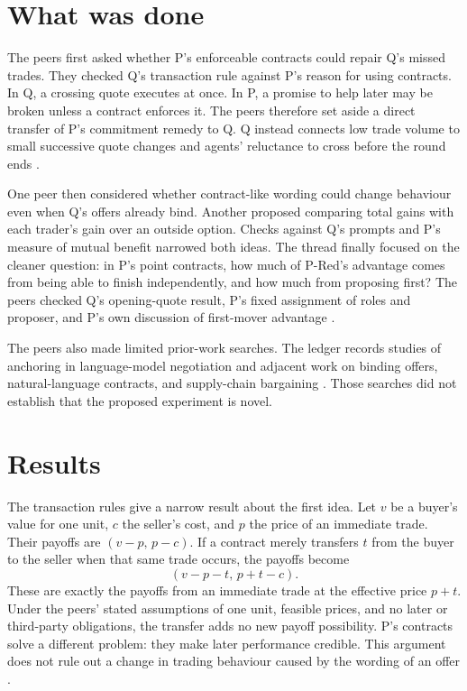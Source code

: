 \documentclass{article}
\begin{document}
\section{What was done}

The peers first asked whether P's enforceable contracts could repair Q's missed trades. They checked Q's
transaction rule against P's reason for using contracts. In Q, a crossing quote executes at once. In P, a
promise to help later may be broken unless a contract enforces it. The peers therefore set aside a direct
transfer of P's commitment remedy to Q. Q instead connects low trade volume to small successive quote changes
and agents' reluctance to cross before the round ends \cite{Q,P}.

One peer then considered whether contract-like wording could change behaviour even when Q's offers already
bind. Another proposed comparing total gains with each trader's gain over an outside option. Checks against
Q's prompts and P's measure of mutual benefit narrowed both ideas. The thread finally focused on the cleaner
question: in P's point contracts, how much of P-Red's advantage comes from being able to finish independently,
and how much from proposing first? The peers checked Q's opening-quote result, P's fixed assignment of roles
and proposer, and P's own discussion of first-mover advantage \cite{Q,P}.

The peers also made limited prior-work searches. The ledger records studies of anchoring in language-model
negotiation \cite{Takenami2025,Rios2025} and adjacent work on binding offers, natural-language contracts, and
supply-chain bargaining \cite{BindingOffers2026,LanguageContracts2026,SupplyChain2026}. Those searches did not
establish that the proposed experiment is novel.

\section{Results}

The transaction rules give a narrow result about the first idea. Let \(v\) be a buyer's value for one unit,
\(c\) the seller's cost, and \(p\) the price of an immediate trade. Their payoffs are \((v-p,\,p-c)\). If a
contract merely transfers \(t\) from the buyer to the seller when that same trade occurs, the payoffs become
\[
  (v-p-t,\,p+t-c).
\]
These are exactly the payoffs from an immediate trade at the effective price \(p+t\). Under the peers' stated
assumptions of one unit, feasible prices, and no later or third-party obligations, the transfer adds no new
payoff possibility. P's contracts solve a different problem: they make later performance credible. This
argument does not rule out a change in trading behaviour caused by the wording of an offer \cite{Q,P}.
\end{document}
